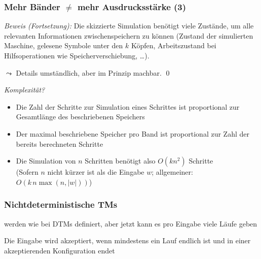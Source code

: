 \documentclass[onlymath]{beamer}
\begin{document}
\begin{frame}[t]\frametitle{Mehr Bänder $\neq$ mehr Ausdrucksstärke (3)}


\emph{Beweis (Fortsetzung):} Die skizzierte Simulation benötigt viele Zustände, um alle relevanten Informationen zwischenspeichern zu können (Zustand der simulierten Maschine, gelesene Symbole unter den $k$ Köpfen, Arbeitszustand bei Hilfsoperationen wie Speicherverschiebung, \ldots).\medskip

$\leadsto$ Details umständlich, aber im Prinzip machbar. \qed
\pause\bigskip

\emph{Komplexität?}
\begin{itemize}
\item Die Zahl der Schritte zur Simulation eines Schrittes ist proportional zur Gesamtlänge des beschriebenen Speichers 
\item Der maximal beschriebene Speicher pro Band ist proportional zur Zahl der bereits berechneten Schritte
\item Die Simulation von $n$ Schritten benötigt also $O(k n^2)$ Schritte\\[-1ex]{\tiny (Sofern $n$ nicht kürzer ist als die Eingabe $w$; allgemeiner: $O(k\, n \max(n,|w|))$)}
\end{itemize}
\end{frame}

\begin{frame}\frametitle{Nichtdeterministische TMs}

\medskip

 werden wie bei DTMs definiert, aber jetzt kann es pro Eingabe viele Läufe geben
\medskip

Die Eingabe wird akzeptiert, wenn mindestens ein Lauf endlich ist und in einer akzeptierenden Konfiguration endet

\end{frame}
\end{document}
